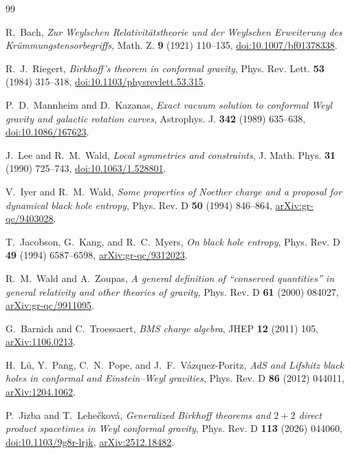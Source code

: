 \documentclass[11pt]{article}
\theoremstyle{definition}
\theoremstyle{remark}
\begin{document}
\begingroup
\raggedright
\begin{thebibliography}{99}

R.~Bach,
\emph{Zur Weylschen Relativit\"atstheorie und der Weylschen Erweiterung des
Kr\"ummungstensorbegriffs},
Math. Z. \textbf{9} (1921) 110--135,
\href{https://doi.org/10.1007/bf01378338}{doi:10.1007/bf01378338}.

R.~J.~Riegert,
\emph{Birkhoff's theorem in conformal gravity},
Phys. Rev. Lett. \textbf{53} (1984) 315--318,
\href{https://doi.org/10.1103/physrevlett.53.315}{doi:10.1103/physrevlett.53.315}.

P.~D.~Mannheim and D.~Kazanas,
\emph{Exact vacuum solution to conformal Weyl gravity and galactic rotation
curves},
Astrophys. J. \textbf{342} (1989) 635--638,
\href{https://doi.org/10.1086/167623}{doi:10.1086/167623}.

J.~Lee and R.~M.~Wald,
\emph{Local symmetries and constraints},
J. Math. Phys. \textbf{31} (1990) 725--743,
\href{https://doi.org/10.1063/1.528801}{doi:10.1063/1.528801}.

V.~Iyer and R.~M.~Wald,
\emph{Some properties of Noether charge and a proposal for dynamical black
hole entropy},
Phys. Rev. D \textbf{50} (1994) 846--864,
\href{https://arxiv.org/abs/gr-qc/9403028}{arXiv:gr-qc/9403028}.

T.~Jacobson, G.~Kang, and R.~C.~Myers,
\emph{On black hole entropy},
Phys. Rev. D \textbf{49} (1994) 6587--6598,
\href{https://arxiv.org/abs/gr-qc/9312023}{arXiv:gr-qc/9312023}.

R.~M.~Wald and A.~Zoupas,
\emph{A general definition of ``conserved quantities'' in general
relativity and other theories of gravity},
Phys. Rev. D \textbf{61} (2000) 084027,
\href{https://arxiv.org/abs/gr-qc/9911095}{arXiv:gr-qc/9911095}.

G.~Barnich and C.~Troessaert,
\emph{BMS charge algebra},
JHEP \textbf{12} (2011) 105,
\href{https://arxiv.org/abs/1106.0213}{arXiv:1106.0213}.

H.~L\"u, Y.~Pang, C.~N.~Pope, and J.~F.~V\'azquez-Poritz,
\emph{AdS and Lifshitz black holes in conformal and Einstein--Weyl
gravities},
Phys. Rev. D \textbf{86} (2012) 044011,
\href{https://arxiv.org/abs/1204.1062}{arXiv:1204.1062}.

P.~Jizba and T.~Lehe\v{c}kov\'a,
\emph{Generalized Birkhoff theorems and \(2+2\) direct product spacetimes in
Weyl conformal gravity},
Phys. Rev. D \textbf{113} (2026) 044060,
\href{https://doi.org/10.1103/9g8r-lrjk}{doi:10.1103/9g8r-lrjk},
\href{https://arxiv.org/abs/2512.18482}{arXiv:2512.18482}.

\end{thebibliography}
\endgroup
\end{document}

